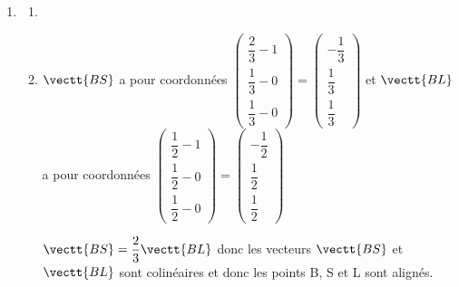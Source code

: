 \begin{enumerate}
$\vectt{AB}\cdot \vectt{BG} = 1\times 0 + 0\times 1 + 0\times 1 = 0$
donc $\vectt{AB}\perp \vectt{BG}$ donc le triangle ABG est rectangle en B.

	\item
		\begin{enumerate}
			\item
{}
			\item 
$\vectt{BS}$ a pour coordonnées  
$\begin{pmatrix}
\dfrac{2}{3} - 1 \\[5pt] 
\dfrac{1}{3} - 0 \\[5pt] 
\dfrac{1}{3} - 0
\end{pmatrix}
=
\begin{pmatrix}
-\dfrac{1}{3} \\[5pt] 
\dfrac{1}{3}  \\[5pt] 
\dfrac{1}{3} 
\end{pmatrix}$
et  $\vectt{BL}$ a pour coordonnées
$\begin{pmatrix}
\dfrac{1}{2} - 1 \\[5pt] 
\dfrac{1}{2} - 0 \\[5pt] 
\dfrac{1}{2} - 0
\end{pmatrix}
=
\begin{pmatrix}
-\dfrac{1}{2} \\[5pt]
\dfrac{1}{2} \\[5pt]
\dfrac{1}{2} 
\end{pmatrix}$

$\vectt{BS} = \dfrac{2}{3} \vectt{BL}$ donc les vecteurs $\vectt{BS}$ et $\vectt{BL}$ sont colinéaires et donc les points B, S et L sont alignés.

		\end{enumerate}
	\end{enumerate}
